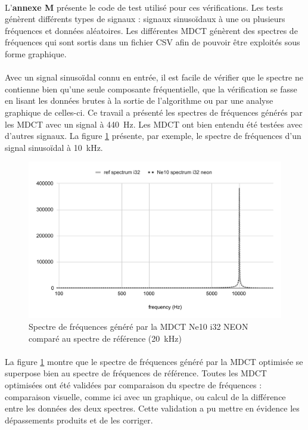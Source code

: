 \documentclass{article}
\begin{document}
    \paragraph{}
    L'\textbf{annexe M} présente le code de test utilisé pour ces vérifications. Les tests génèrent différents types de signaux : signaux sinusoïdaux à une ou plusieurs fréquences et données aléatoires. Les différentes MDCT génèrent des spectres de fréquences qui sont sortis dans un fichier CSV afin de pouvoir être exploités sous forme graphique.

    \paragraph{}
    Avec un signal sinusoïdal connu en entrée, il est facile de vérifier que le spectre ne contienne bien qu'une seule composante fréquentielle, que la vérification se fasse en lisant les données brutes à la sortie de l'algorithme ou par une analyse graphique de celles-ci. Ce travail a présenté les spectres de fréquences générés par les MDCT avec un signal à \SI{440}{\hertz}. Les MDCT ont bien entendu été testées avec d'autres signaux. La figure \ref{fig:validation_ne10_i32_neon_10k} présente, par exemple, le spectre de fréquences d'un signal sinusoïdal à \SI{10}{\kilo\hertz}.
    \begin{figure}[H]
        \centering
        \includegraphics[width=.8\linewidth]{./images/validation_ne10_i32_neon_10k.pdf}
        \caption{Spectre de fréquences généré par la MDCT Ne10 i32 NEON comparé au spectre de référence (\SI{20}{\kilo\hertz})}
        \label{fig:validation_ne10_i32_neon_10k}
    \end{figure}

    \paragraph{}
    La figure \ref{fig:validation_ne10_i32_neon_10k} montre que le spectre de fréquences généré par la MDCT optimisée se superpose bien au spectre de fréquences de référence. Toutes les MDCT optimisées ont été validées par comparaison du spectre de fréquences : comparaison visuelle, comme ici avec un graphique, ou calcul de la différence entre les données des deux spectres. Cette validation a pu mettre en évidence les dépassements produits et de les corriger.
\end{document}
